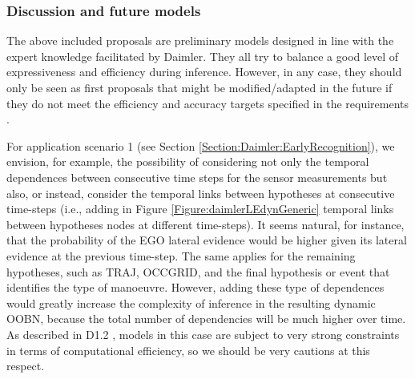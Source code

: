 %
%
%

\subsubsection{Discussion and future models}\label{subsubsection:daimlerfuture}

The above included proposals are preliminary models designed in line with the expert knowledge facilitated by Daimler. They all try to balance a good level of expressiveness and efficiency during inference. However, in any case, they should only be seen as first proposals that might be modified/adapted in the future if they do not meet the efficiency and accuracy targets specified in the requirements \cite{Fer14}. 

For application scenario 1 (see Section \ref{Section:Daimler:EarlyRecognition}), we envision, for example, the possibility of considering not only the temporal dependences between consecutive time steps for the sensor measurements but also, or instead, consider the temporal links between hypotheses at consecutive time-steps (i.e., adding in Figure \ref{Figure:daimlerLEdynGeneric} temporal links between hypotheses nodes at different time-steps). It seems natural, for instance, that the probability of the EGO lateral evidence would be higher given its lateral evidence at the previous time-step. The same applies for the remaining hypotheses, such as TRAJ, OCCGRID, and the final hypothesis or event that identifies the type of manoeuvre. However, adding these type of dependences would greatly increase the complexity of inference in the resulting dynamic OOBN, because the total number of dependencies will be much higher over time. As described in D1.2 \cite{Fer14}, models in this case are subject to very strong constraints in terms of computational efficiency, so we should be very cautions at this respect. 

